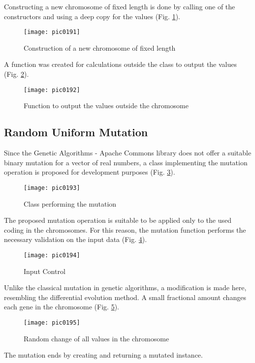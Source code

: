 Constructing a new chromosome of fixed length is done by calling one of the constructors and using a deep copy for the values (Fig. \ref{fig:pic0191}).

\begin{figure}[h]
\centering
\texttt{[image: pic0191]}
\caption{Construction of a new chromosome of fixed length}
\label{fig:pic0191}
\end{figure}
\FloatBarrier

A function was created for calculations outside the class to output the values (Fig. \ref{fig:pic0192}).

\begin{figure}[h]
\centering
\texttt{[image: pic0192]}
\caption{Function to output the values outside the chromosome}
\label{fig:pic0192}
\end{figure}
\FloatBarrier

\subsection{Random Uniform Mutation}

Since the Genetic Algorithms - Apache Commons library does not offer a suitable binary mutation for a vector of real numbers, a class implementing the mutation operation is proposed for development purposes (Fig. \ref{fig:pic0193}).

\begin{figure}[h]
\centering
\texttt{[image: pic0193]}
\caption{Class performing the mutation}
\label{fig:pic0193}
\end{figure}
\FloatBarrier

The proposed mutation operation is suitable to be applied only to the used coding in the chromosomes. For this reason, the mutation function performs the necessary validation on the input data (Fig. \ref{fig:pic0194}).

\begin{figure}[h]
\centering
\texttt{[image: pic0194]}
\caption{Input Control}
\label{fig:pic0194}
\end{figure}
\FloatBarrier

Unlike the classical mutation in genetic algorithms, a modification is made here, resembling the differential evolution method. A small fractional amount changes each gene in the chromosome (Fig. \ref{fig:pic0195}).

\begin{figure}[h]
\centering
\texttt{[image: pic0195]}
\caption{Random change of all values in the chromosome}
\label{fig:pic0195}
\end{figure}
\FloatBarrier

The mutation ends by creating and returning a mutated instance.
